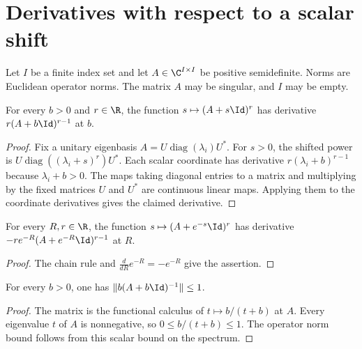\section{Derivatives with respect to a scalar shift}
\label{sec:shifted_power_derivative}

Let $I$ be a finite index set and let $A\in\C^{I\times I}$ be positive
semidefinite. Norms are Euclidean operator norms. The matrix $A$ may be
singular, and $I$ may be empty.


\begin{theorem}
    \label{thm:shifted_power_derivative}
    \leanok
    For every $b>0$ and $r\in\R$, the function $s\mapsto(A+s\Id)^r$
    has derivative $r(A+b\Id)^{r-1}$ at $b$.
\end{theorem}

\begin{proof}
    \leanok
    Fix a unitary eigenbasis $A=U\operatorname{diag}(\lambda_i)U^*$.
    For $s>0$, the shifted power is
    $U\operatorname{diag}((\lambda_i+s)^r)U^*$.
    Each scalar coordinate has derivative
    $r(\lambda_i+b)^{r-1}$ because $\lambda_i+b>0$.
    The maps taking diagonal entries to a matrix and multiplying by the
    fixed matrices $U$ and $U^*$ are continuous linear maps. Applying them
    to the coordinate derivatives gives the claimed derivative.
\end{proof}

\begin{theorem}
    \label{thm:exp_regularization_derivative}
    \leanok
    For every $R,r\in\R$, the function $s\mapsto(A+e^{-s}\Id)^r$
    has derivative $-re^{-R}(A+e^{-R}\Id)^{r-1}$ at $R$.
\end{theorem}

\begin{proof}
    \leanok
    The chain rule and $\frac{d}{dR}e^{-R}=-e^{-R}$ give the assertion.
\end{proof}

\begin{theorem}
    \label{thm:shifted_inverse_contraction}
    \leanok
    For every $b>0$, one has $\|b(A+b\Id)^{-1}\|\le1$.
\end{theorem}

\begin{proof}
    \leanok
    The matrix is the functional calculus of $t\mapsto b/(t+b)$ at $A$.
    Every eigenvalue $t$ of $A$ is nonnegative, so $0\le b/(t+b)\le1$.
    The operator norm bound follows from this scalar bound on the spectrum.
\end{proof}
